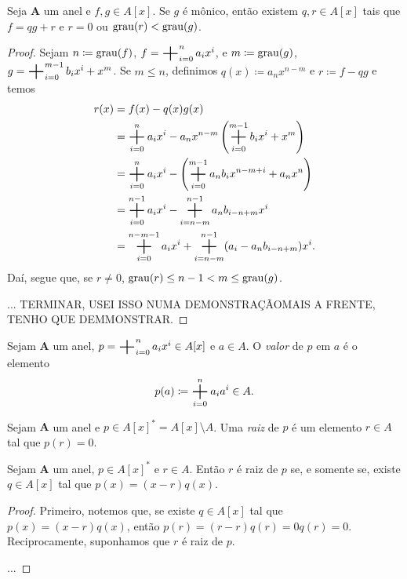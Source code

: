 \begin{prop}
	Seja $\bm A$ um anel e $f,g \in A[x]$. Se $g$ é mônico, então existem $q,r \in A[x]$ tais que $f=qg+r$ e $r=0$ ou $\operatorname{grau}(r) < \operatorname{grau}(g)$.
\end{prop}
\begin{proof}
	Sejam $n \coloneqq \operatorname{grau}(f)$, $f = \bigsum_{i=0}^n a_ix^i$, e $m \coloneqq \operatorname{grau}(g)$, $g = \bigsum_{i=0}^{m-1} b_ix^i + x^m$. Se $m \leq n$, definimos $q(x) \coloneqq a_nx^{n-m}$ e $r \coloneqq f-qg$ e temos
	\begin{align*}
	r(x) &= f(x) - q(x)g(x) \\
	&= \bigsum_{i=0}^n a_ix^i - a_nx^{n-m}\left(\bigsum_{i=0}^{m-1} b_ix^i + x^m\right) \\
	&= \bigsum_{i=0}^n a_ix^i - \left(\bigsum_{i=0}^{m-1} a_nb_ix^{n-m+i} + a_nx^n\right) \\
	&= \bigsum_{i=0}^{n-1} a_ix^i - \bigsum_{i=n-m}^{n-1} a_nb_{i-n+m}x^i \\
	&= \bigsum_{i=0}^{n-m-1} a_ix^i + \bigsum_{i=n-m}^{n-1} (a_i - a_nb_{i-n+m})x^i.
	\end{align*}
Daí, segue que, se $r \neq 0$, $\operatorname{grau}(r) \leq n-1 < m  \leq \operatorname{grau}(g)$.

... TERMINAR, USEI ISSO NUMA DEMONSTRAÇÃOMAIS A FRENTE, TENHO QUE DEMMONSTRAR.
\end{proof}

\begin{defi}
	Sejam $\bm A$ um anel, $p = \bigsum_{i=0}^n a_ix^i \in A[x]$ e $a \in A$. O \emph{valor} de $p$ em $a$ é o elemento
	\begin{equation*}
	p(a) \coloneqq \bigsum_{i=0}^n a_ia^i \in A.
	\end{equation*}
\end{defi}

\begin{defi}
	Sejam $\bm A$ um anel e $p \in A[x]^* = A[x] \setminus A$. Uma \emph{raiz} de $p$ é um elemento $r \in A$ tal que $p(r)=0$.
\end{defi}

\begin{prop}
	Sejam $\bm A$ um anel, $p \in A[x]^*$ e $r \in A$. Então $r$ é raiz de $p$ se, e somente se, existe $q \in A[x]$ tal que $p(x)=(x-r)q(x)$.
\end{prop}
\begin{proof}
	Primeiro, notemos que, se existe $q \in A[x]$ tal que $p(x)=(x-r)q(x)$, então $p(r)=(r-r)q(r)=0q(r)=0$. Reciprocamente, suponhamos que $r$ é raiz de $p$.

	...
\end{proof}

